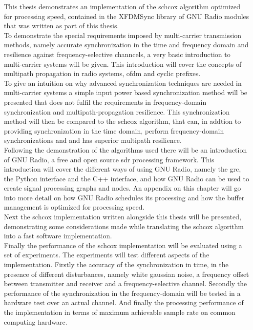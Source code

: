 This thesis demonstrates an implementation of the \acrshort{schcox}
algorithm optimized for processing speed, contained in
the XFDMSync\cite{xfdmsyncweb} library of GNU Radio modules
that was written as part of this thesis. \\

To demonstrate the special requirements imposed by multi-carrier
transmission methods, namely accurate synchronization in the
time and frequency domain and resilience against frequency-selective channcels,
a very basic introduction to multi-carrier systems will be given.
This introduction will cover the concepts of multipath propagation
in radio systems, \acrshort{ofdm} and cyclic prefixes. \\

To give an intuition on why advanced synchronization techniques
are needed in multi-carrier systems a simple input power based
synchronization method will be presented that does not fulfil the requirements
in frequency-domain synchronization and multipath-propagation resilience.
This synchronization method will then be compared to the \acrlong{schcox}
algorithm, that can, in addtion to providing synchronization in
the time domain, perform frequency-domain synchronizations and
and has superior multipath resilience. \\

Following the demonstration of the algorithms used there will be
an introduction of GNU Radio, a free and open source \gls{sdr}
processing framework.
This introduction will cover the different ways of using GNU Radio,
namely the \acrlong{grc}, the Python interface and the C++ interface,
and how GNU Radio can be used to create signal processing graphs
and nodes.
An appendix on this chapter will go into more detail on how
GNU Radio schedules its processing and how the buffer management
is optimized for processing speed. \\

Next the \acrlong{schcox} implementation written alongside
this thesis will be presented, demonstrating some considerations
made while translating the \acrshort{schcox} algorithm
into a fast software implementation. \\

Finally the performance of the \acrshort{schcox} implementation
will be evaluated using a set of experiments.
The experiments will test different aspects of the implementation.
Firstly the accuracy of the synchronization in time, in the presence
of different disturbances, namely white gaussian noise, a frequency offset
between transmitter and receiver and a frequency-selective channel.
Secondly the performance of the synchronization in the frequency-domain
will be tested in a hardware test over an actual channel.
And finally the processing performance of the implementation
in terms of maximum achievable sample rate on common computing
hardware. \\
